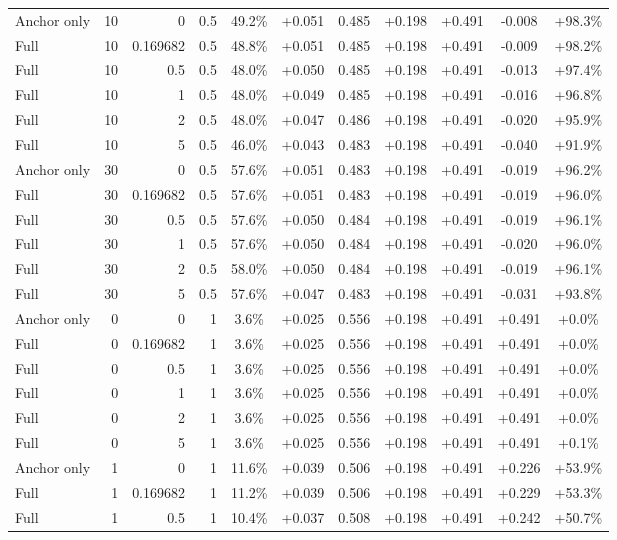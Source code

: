 \begin{table}[htbp]
\begin{tabular}{lrrrccccccc}
Anchor only & 10 & 0 & 0.5 & 49.2\% & +0.051 & 0.485 & +0.198 & +0.491 & -0.008 & +98.3\% \\
Full & 10 & 0.169682 & 0.5 & 48.8\% & +0.051 & 0.485 & +0.198 & +0.491 & -0.009 & +98.2\% \\
Full & 10 & 0.5 & 0.5 & 48.0\% & +0.050 & 0.485 & +0.198 & +0.491 & -0.013 & +97.4\% \\
Full & 10 & 1 & 0.5 & 48.0\% & +0.049 & 0.485 & +0.198 & +0.491 & -0.016 & +96.8\% \\
Full & 10 & 2 & 0.5 & 48.0\% & +0.047 & 0.486 & +0.198 & +0.491 & -0.020 & +95.9\% \\
Full & 10 & 5 & 0.5 & 46.0\% & +0.043 & 0.483 & +0.198 & +0.491 & -0.040 & +91.9\% \\
Anchor only & 30 & 0 & 0.5 & 57.6\% & +0.051 & 0.483 & +0.198 & +0.491 & -0.019 & +96.2\% \\
Full & 30 & 0.169682 & 0.5 & 57.6\% & +0.051 & 0.483 & +0.198 & +0.491 & -0.019 & +96.0\% \\
Full & 30 & 0.5 & 0.5 & 57.6\% & +0.050 & 0.484 & +0.198 & +0.491 & -0.019 & +96.1\% \\
Full & 30 & 1 & 0.5 & 57.6\% & +0.050 & 0.484 & +0.198 & +0.491 & -0.020 & +96.0\% \\
Full & 30 & 2 & 0.5 & 58.0\% & +0.050 & 0.484 & +0.198 & +0.491 & -0.019 & +96.1\% \\
Full & 30 & 5 & 0.5 & 57.6\% & +0.047 & 0.483 & +0.198 & +0.491 & -0.031 & +93.8\% \\
Anchor only & 0 & 0 & 1 & 3.6\% & +0.025 & 0.556 & +0.198 & +0.491 & +0.491 & +0.0\% \\
Full & 0 & 0.169682 & 1 & 3.6\% & +0.025 & 0.556 & +0.198 & +0.491 & +0.491 & +0.0\% \\
Full & 0 & 0.5 & 1 & 3.6\% & +0.025 & 0.556 & +0.198 & +0.491 & +0.491 & +0.0\% \\
Full & 0 & 1 & 1 & 3.6\% & +0.025 & 0.556 & +0.198 & +0.491 & +0.491 & +0.0\% \\
Full & 0 & 2 & 1 & 3.6\% & +0.025 & 0.556 & +0.198 & +0.491 & +0.491 & +0.0\% \\
Full & 0 & 5 & 1 & 3.6\% & +0.025 & 0.556 & +0.198 & +0.491 & +0.491 & +0.1\% \\
Anchor only & 1 & 0 & 1 & 11.6\% & +0.039 & 0.506 & +0.198 & +0.491 & +0.226 & +53.9\% \\
Full & 1 & 0.169682 & 1 & 11.2\% & +0.039 & 0.506 & +0.198 & +0.491 & +0.229 & +53.3\% \\
Full & 1 & 0.5 & 1 & 10.4\% & +0.037 & 0.508 & +0.198 & +0.491 & +0.242 & +50.7\% \\

\end{tabular}
\end{table}
